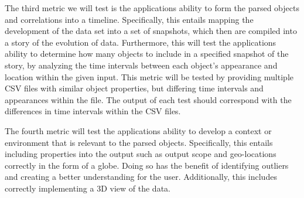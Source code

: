 \documentclass[letterpaper,10pt,titlepage, onecolumn]{IEEEtran}
\begin{document}
The third metric we will test is the applications ability to form the parsed objects and correlations into a timeline. Specifically, this entails mapping the development of the data set into a set of snapshots, which then are compiled into a story of the evolution of data. Furthermore, this will test the applications ability to determine how many objects to include in a specified snapshot of the story, by analyzing the time intervals between each object’s appearance and location within the given input. This metric will be tested by providing multiple CSV files with similar object properties, but differing time intervals and appearances within the file. The output of each test should correspond with the differences in time intervals within the CSV files. 

The fourth metric will test the applications ability to develop a context or environment that is relevant to the parsed objects. Specifically, this entails including properties into the output such as output scope and geo-locations correctly in the form of a globe. Doing so has the benefit of identifying outliers and creating a better understanding for the user. Additionally, this includes correctly implementing a 3D view of the data. 
\end{document}
